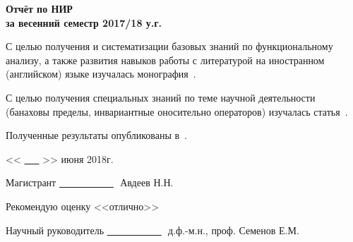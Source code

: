 \documentclass[a4paper,12pt,openbib]{report}
\begin{document}



\begin{center}{ \bf \Large Отчёт по НИР \\ за весенний семестр 2017/18 у.г.}%
\end{center}

С целью получения и систематизации базовых знаний по функциональному анализу,
а также развития навыков работы с литературой на иностранном (английском) языке изучалась монография~\cite{wojtaszczyk1996banach}.

С целью получения специальных знаний по теме научной деятельности (банаховы пределы, инвариантные оносительно операторов)
изучалась статья~\cite{Semenov2010invariant}.

Полученные результаты опубликованы в~\cite{our-vvmsh-2018}.

\begingroup
\renewcommand{\cleardoublepage}{}
\renewcommand{\clearpage}{}
\printbibliography
\endgroup

<< \underline{~~~} >> июня 2018г.

\vspace{2em}

Магистрант \hfill \underline{~~~~~~~~~~~}\,\,\,\,Авдеев Н.Н.\newline

\vspace{2em}

Рекомендую оценку <<отлично>>

\vspace{2em}

Научный руководитель \hfill \underline{~~~~~~~~~~~}\,\,\,\,д.ф.-м.н., проф. Семенов Е.М.\newline
\end{document}
